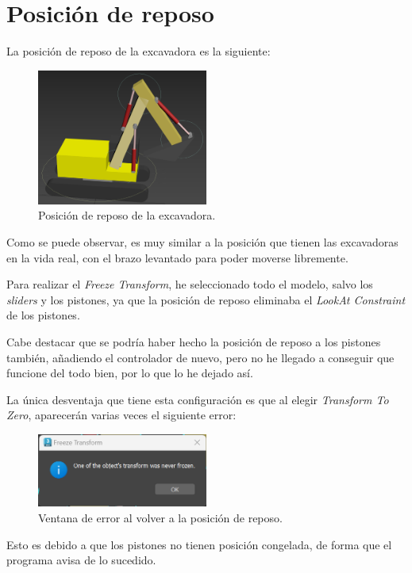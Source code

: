 \section{Posición de reposo}

La posición de reposo de la excavadora es la siguiente:

\begin{figure}[H]
    \centering
    \includegraphics[width=0.5\textwidth]{imagenes/idle.png}
    \caption{Posición de reposo de la excavadora.}
 \end{figure}

 Como se puede observar, es muy similar a la posición que tienen las excavadoras en la vida real, con el brazo levantado para poder moverse libremente.

 \bigskip

Para realizar el \textit{Freeze Transform}, he seleccionado todo el modelo, salvo los \textit{sliders} y los pistones, ya que la posición de reposo eliminaba el \textit{LookAt Constraint} de los pistones.

\bigskip

Cabe destacar que se podría haber hecho la posición de reposo a los pistones también, añadiendo el controlador de nuevo, pero no he llegado a conseguir que funcione del todo bien, por lo que lo he dejado así.

\bigskip
\newpage

La única desventaja que tiene esta configuración es que al elegir \textit{Transform To Zero}, aparecerán varias veces el siguiente error:

\begin{figure}[H]
    \centering
    \includegraphics[width=0.5\textwidth]{imagenes/error.png}
    \caption{Ventana de error al volver a la posición de reposo.}
 \end{figure}

Esto es debido a que los pistones no tienen posición congelada, de forma que el programa avisa de lo sucedido.